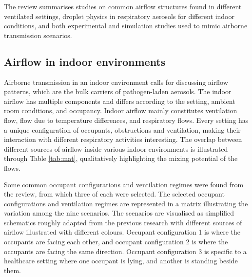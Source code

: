 \documentclass[a4paper,12pt]{elsarticle}
\begin{document}
The review summarises studies on common airflow structures found in different ventilated settings, droplet physics in respiratory aerosols for different indoor conditions, and both experimental and simulation studies used to mimic airborne transmission scenarios.

\subsection{Airflow in indoor environments}

Airborne transmission in an indoor environment calls for discussing airflow patterns, which are the bulk carriers of pathogen-laden aerosols. The indoor airflow has multiple components and differs according to the setting, ambient room conditions, and occupancy. Indoor airflow mainly constitutes ventilation flow, flow due to temperature differences, and respiratory flows. Every setting has a unique configuration of occupants, obstructions and ventilation, making their interaction with different respiratory activities interesting. The overlap between different sources of airflow inside various indoor environments is illustrated through Table \ref{tab:mat}, qualitatively highlighting the mixing potential of the flows.

Some common occupant configurations and ventilation regimes were found from the review, from which three of each were selected. The selected occupant configurations and ventilation regimes are represented in a matrix illustrating the variation among the nine scenarios. The scenarios are visualised as simplified schematics roughly adapted from the previous research with different sources of airflow illustrated with different colours. Occupant configuration 1 is where the occupants are facing each other, and occupant configuration 2 is where the occupants are facing the same direction. Occupant configuration 3 is specific to a healthcare setting where one occupant is lying, and another is standing beside them.
\end{document}

